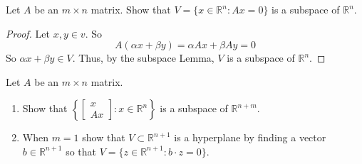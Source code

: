 \begin{exercise} \label{e1.4.3}
    Let \( A \) be an \(m \times n\) matrix. Show that \(V = \{x \in \mathbb{R}^n : Ax=0 \}\) is a subspace of \(\mathbb{R}^n\).
    
    \begin{proof}
        Let \(x,y \in v\). So
        \[ A(\alpha x+\beta y) = \alpha Ax + \beta Ay = 0 \]
        So \(\alpha x + \beta y \in V\). Thus, by the subspace Lemma, \(V\) is a subspace of \(\mathbb{R}^n\).
    \end{proof}
\end{exercise} %

\begin{exercise} \label{e1.4.4}
    Let \( A \) be an \(m \times n\) matrix.
    \begin{enumerate}
        \item Show that \(\left\{ \begin{bmatrix} x \\ Ax \end{bmatrix} : x \in \mathbb{R}^n \right\}\) is a subspace of \(\mathbb{R}^{n+m}\).
        
        \item When \(m=1\) show that \(V \subset \mathbb{R}^{n+1}\) is a hyperplane by finding a vector \(b \in \mathbb{R}^{n+1}\) so that \( V=\{ z \in \mathbb{R}^{n+1} : b \cdot z = 0 \} \).
    \end{enumerate}
    

\end{exercise}
